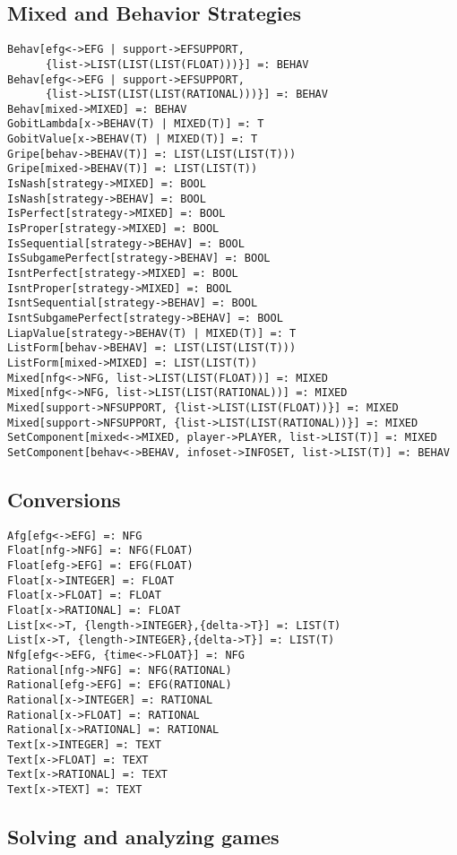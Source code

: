 \subsection{Mixed and Behavior Strategies}

\begin{verbatim}
Behav[efg<->EFG | support->EFSUPPORT, 
      {list->LIST(LIST(LIST(FLOAT)))}] =: BEHAV
Behav[efg<->EFG | support->EFSUPPORT, 
      {list->LIST(LIST(LIST(RATIONAL)))}] =: BEHAV
Behav[mixed->MIXED] =: BEHAV
GobitLambda[x->BEHAV(T) | MIXED(T)] =: T
GobitValue[x->BEHAV(T) | MIXED(T)] =: T
Gripe[behav->BEHAV(T)] =: LIST(LIST(LIST(T)))
Gripe[mixed->BEHAV(T)] =: LIST(LIST(T))
IsNash[strategy->MIXED] =: BOOL
IsNash[strategy->BEHAV] =: BOOL
IsPerfect[strategy->MIXED] =: BOOL
IsProper[strategy->MIXED] =: BOOL
IsSequential[strategy->BEHAV] =: BOOL
IsSubgamePerfect[strategy->BEHAV] =: BOOL
IsntPerfect[strategy->MIXED] =: BOOL
IsntProper[strategy->MIXED] =: BOOL
IsntSequential[strategy->BEHAV] =: BOOL
IsntSubgamePerfect[strategy->BEHAV] =: BOOL
LiapValue[strategy->BEHAV(T) | MIXED(T)] =: T
ListForm[behav->BEHAV] =: LIST(LIST(LIST(T)))
ListForm[mixed->MIXED] =: LIST(LIST(T))
Mixed[nfg<->NFG, list->LIST(LIST(FLOAT))] =: MIXED
Mixed[nfg<->NFG, list->LIST(LIST(RATIONAL))] =: MIXED
Mixed[support->NFSUPPORT, {list->LIST(LIST(FLOAT))}] =: MIXED
Mixed[support->NFSUPPORT, {list->LIST(LIST(RATIONAL))}] =: MIXED
SetComponent[mixed<->MIXED, player->PLAYER, list->LIST(T)] =: MIXED 
SetComponent[behav<->BEHAV, infoset->INFOSET, list->LIST(T)] =: BEHAV 
\end{verbatim}

\subsection{Conversions}

\begin{verbatim}
Afg[efg<->EFG] =: NFG
Float[nfg->NFG] =: NFG(FLOAT)
Float[efg->EFG] =: EFG(FLOAT)
Float[x->INTEGER] =: FLOAT
Float[x->FLOAT] =: FLOAT
Float[x->RATIONAL] =: FLOAT
List[x<->T, {length->INTEGER},{delta->T}] =: LIST(T)
List[x->T, {length->INTEGER},{delta->T}] =: LIST(T)
Nfg[efg<->EFG, {time<->FLOAT}] =: NFG
Rational[nfg->NFG] =: NFG(RATIONAL)
Rational[efg->EFG] =: EFG(RATIONAL)
Rational[x->INTEGER] =: RATIONAL
Rational[x->FLOAT] =: RATIONAL
Rational[x->RATIONAL] =: RATIONAL
Text[x->INTEGER] =: TEXT
Text[x->FLOAT] =: TEXT
Text[x->RATIONAL] =: TEXT
Text[x->TEXT] =: TEXT
\end{verbatim}

\subsection{Solving and analyzing games}

